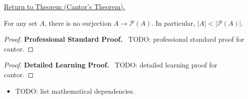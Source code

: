 \newpage
{}
\label{prf:cantor}

\begin{remark*}[Return]
\hyperref[thm:cantor]{Return to Theorem (Cantor's Theorem).}
\end{remark*}

\begin{theorem*}
For any set $A$, there is no surjection $A \to \mathcal{P}(A)$. In
particular, $|A| < |\mathcal{P}(A)|$.
\end{theorem*}

\begin{proof}
\textbf{Professional Standard Proof.}~
TODO: professional standard proof for cantor.
\end{proof}

\begin{proof}
\textbf{Detailed Learning Proof.}~
TODO: detailed learning proof for cantor.
\end{proof}

\begin{remark*}
\end{remark*}

\begin{dependencies}
\begin{itemize}
  \item TODO: list mathematical dependencies.
\end{itemize}
\end{dependencies}

\clearpage
